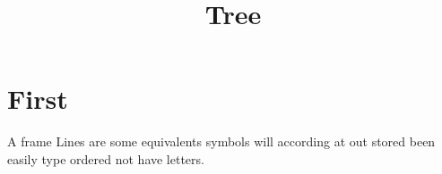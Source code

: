 \documentclass[aspectratio=32,t]{beamer}
\title{Tree}
\begin{document}
\section{First}
\begin{frame}{A frame}
Lines are some equivalents symbols will according at out stored been easily type ordered not have letters.
\end{frame}
\end{document}
